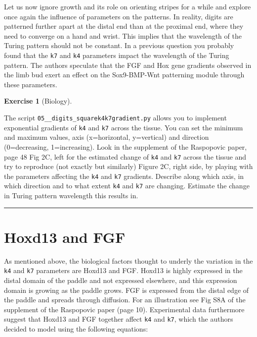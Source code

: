 \documentclass[
  letterpaper,
  DIV=11,
  numbers=noendperiod]{scrreprt}
\theoremstyle{definition}
\newtheorem{exercise}{Exercise}[chapter]
\theoremstyle{remark}
\begin{document}
Let us now ignore growth and its role on orienting stripes for a while
and explore once again the influence of parameters on the patterns. In
reality, digits are patterned further apart at the distal end than at
the proximal end, where they need to converge on a hand and wrist. This
implies that the wavelength of the Turing pattern should not be
constant. In a previous question you probably found that the \texttt{k7}
and \texttt{k4} parameters impact the wavelength of the Turing pattern.
The authors speculate that the FGF and Hox gene gradients observed in
the limb bud exert an effect on the Sox9-BMP-Wnt patterning module
through these parameters.

\begin{exercise}[Biology]\protect\hypertarget{exr-tur}{}\label{exr-tur}

The script \texttt{05\_\_digits\_squarek4k7gradient.py} allows you to
implement exponential gradients of \texttt{k4} and \texttt{k7} across
the tissue. You can set the minimum and maximum values, axis
(x=horizontal, y=vertical) and direction (0=decreasing, 1=increasing).
Look in the supplement of the Raspopovic paper, page 48 Fig 2C, left for
the estimated change of \texttt{k4} and \texttt{k7} across the tissue
and try to reproduce (not exactly but similarly) Figure 2C, right side,
by playing with the parameters affecting the \texttt{k4} and \texttt{k7}
gradients. Describe along which axis, in which direction and to what
extent \texttt{k4} and \texttt{k7} are changing. Estimate the change in
Turing pattern wavelength this results in.

\end{exercise}

\begin{center}\rule{0.5\linewidth}{0.5pt}\end{center}

\section{Hoxd13 and FGF}\label{hoxd13-and-fgf}

As mentioned above, the biological factors thought to underly the
variation in the \texttt{k4} and \texttt{k7} parameters are Hoxd13 and
FGF. Hoxd13 is highly expressed in the distal domain of the paddle and
not expressed elsewhere, and this expression domain is growing as the
paddle grows. FGF is expressed from the distal edge of the paddle and
spreads through diffusion. For an illustration see Fig S8A of the
supplement of the Raspopovic paper (page 10). Experimental data
furthermore suggest that Hoxd13 and FGF together affect \texttt{k4} and
\texttt{k7}, which the authors decided to model using the following
equations:
\end{document}
